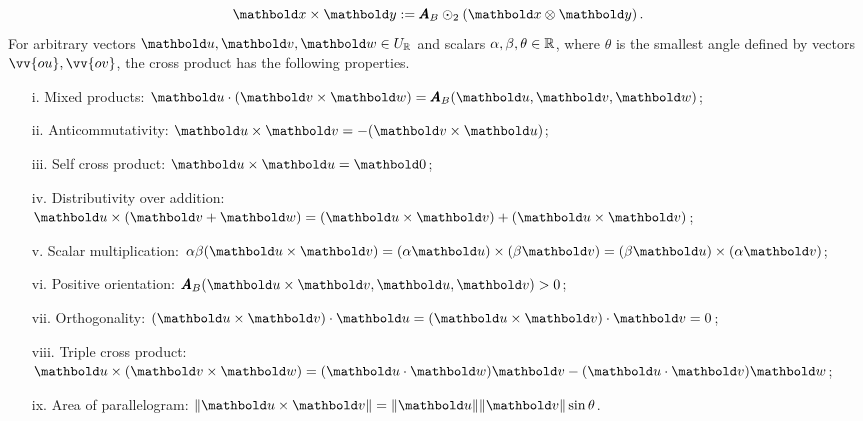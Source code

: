 \begin{equation}\label{eq:crossProduct}
\vto{x}\times\vto{y} := \tnr{A}_B\odot_2 (\vto{x}\otimes\vto{y})\,.
\end{equation}
For arbitrary vectors $\vto{u},\vto{v},\vto{w}\in U_\real$ and scalars $\alpha,\beta,\theta\in\mathbb{R}$, where $\theta$ is the smallest angle defined by vectors $\vv{ou},\vv{ov}$, the cross product has the following properties.
\begin{itemize}
	\setlength\itemsep{.1em}
	\item[i.] Mixed products: $\vto{u}\cdot(\vto{v}\times\vto{w})=\fua{\tnr{A}_B}{\vto{u},\vto{v},\vto{w}}$;
	\item[ii.] Anticommutativity: $\vto{u}\times\vto{v}=-(\vto{v}\times\vto{u})$;
	\item[iii.] Self cross product: $\vto{u}\times\vto{u}=\vto{0}$;
	\item[iv.] Distributivity over addition: $\vto{u}\times(\vto{v}+\vto{w})=(\vto{u}\times\vto{v})+(\vto{u}\times\vto{v})$;
	\item[v.] Scalar multiplication: $\alpha\beta(\vto{u}\times\vto{v})=(\alpha\vto{u})\times(\beta\vto{v})=(\beta\vto{u})\times(\alpha\vto{v})$;
	\item[vi.] Positive orientation: $\tnr{A}_B(\vto{u}\times\vto{v},\vto{u},\vto{v})>0$;
	\item[vii.] Orthogonality: $(\vto{u}\times\vto{v})\cdot\vto{u}=(\vto{u}\times\vto{v})\cdot\vto{v}=0$;
	\item[viii.] Triple cross product: $\vto{u}\times(\vto{v}\times\vto{w})=(\vto{u}\cdot\vto{w})\vto{v}-(\vto{u}\cdot\vto{v})\vto{w}$;
	\item[ix.] Area of parallelogram: $\|\vto{u}\times\vto{v}\|= \|\vto{u} \|\|\vto{v} \|\sin\theta$.
\end{itemize}


